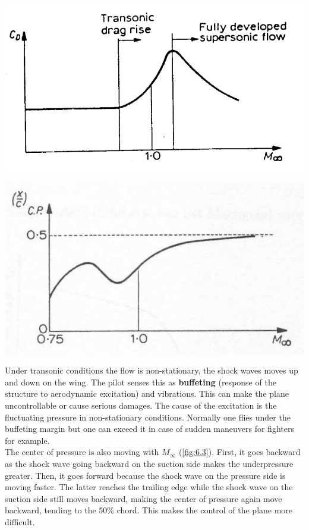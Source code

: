 	\begin{center}
	\begin{minipage}{0.3\textwidth}
	\includegraphics[scale=0.3]{ch6/2}
	\label{fig:6.2}
	\end{minipage}
	\begin{minipage}{0.3\textwidth}
	\includegraphics[scale=0.3]{ch6/3}
	\label{fig:6.3}
	\end{minipage}
	\end{center}
	
	Under transonic conditions the flow is non-stationary, the shock waves moves up and down on the wing. The pilot senses this as \textbf{buffeting} (response of the structure to aerodynamic excitation) and vibrations. This can make the plane uncontrollable or cause serious damages. The cause of the excitation is the fluctuating pressure in non-stationary conditions. Normally one flies under the buffeting margin but one can exceed it in case of sudden maneuvers for fighters for example. \\
	
	The center of pressure is also moving with $M_\infty$ (\autoref{fig:6.3}). First, it goes backward as the shock wave going backward on the suction side makes the underpressure greater. Then, it goes forward because the shock wave on the pressure side is moving faster. The latter reaches the trailing edge while the shock wave on the suction side still moves backward, making the center of pressure again move backward, tending to the 50\% chord. This makes the control of the plane more difficult. \\
	
